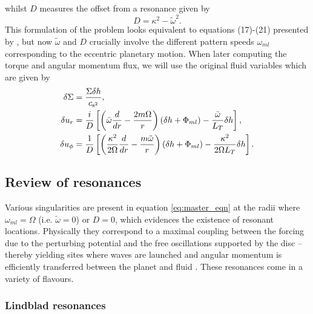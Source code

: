 %
whilst $D$ measures the offset from a resonance given by
%
\begin{equation}
    \label{eqn:resonance_offset}
    D = \kappa^2-\tilde{\omega}^2.
\end{equation}
%
This formulation of the problem looks equivalent to equations (17)-(21) presented by \cite{MirandaRafikov_2020}, but now $\tilde{\omega}$ and $D$ crucially involve the different pattern speeds $\omega_{ml}$ corresponding to the eccentric planetary motion. When later computing the torque and angular momentum flux, we will use the original fluid variables which are given by  
%
\begin{align}
    \label{eq:dsigma_dh}
    \delta\Sigma & = \frac{\Sigma \delta h}{c_{\textrm{s}^2}} , \\
    \label{eq:dur_dh}
    \delta u_r &= \frac{i}{D} \left[ \left( \Tilde{\omega}\frac{d}{d r}-\frac{2m\Omega}{r}\right)(\delta h+\Phi_{ml})-\frac{\Tilde{\omega}}{L_T}\delta h\right] , \\
    \label{eq:duphi_dh}
    \delta u_\phi & = \frac{1}{D} \left[ \left( \frac{\kappa^2}{2\Omega}\frac{d}{d r}-\frac{m\tilde{\omega}}{r}\right)(\delta h+\Phi_{ml})-\frac{\kappa^2}{2\Omega L_T}\delta h \right].
\end{align}
%

\subsection{Review of resonances}
\label{subsection:resonances}

Various singularities are present in equation \eqref{eq:master_eqn} at the radii where $\omega_{ml}=\Omega$ (i.e. $\tilde\omega=0$) or $D=0$, which evidences the existence of resonant locations. Physically they correspond to a maximal coupling between the forcing due to the perturbing potential and the free oscillations supported by the disc -- thereby yielding sites where waves are launched and angular momentum is efficiently transferred between the planet and fluid \citep[e.g.][]{GoldreichTremaine_1979}. These resonances come in a variety of flavours. 

\subsubsection{Lindblad resonances}

